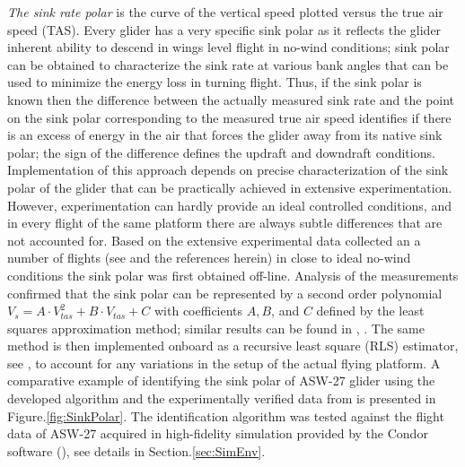 \documentclass{ifacconf}
\begin{document}
\emph{The sink rate polar} is the curve of the vertical speed plotted versus the true air speed (TAS). Every glider has a very specific sink polar as it reflects the glider inherent ability to descend in wings level flight in no-wind conditions; sink polar can be obtained to characterize the sink rate at various bank angles that can be used to minimize the energy loss in turning flight. Thus, if the sink polar is known then the difference between the actually measured sink rate and the point on the sink polar corresponding to the measured true air speed identifies if there is an excess of energy in the air that forces the glider away from its native sink polar; the sign of the difference defines the updraft and downdraft conditions. Implementation of this approach depends on precise characterization of the sink polar of the glider that can be practically achieved in extensive experimentation. However, experimentation can hardly provide an ideal controlled conditions, and in every flight of the same platform there are always subtle differences that are not accounted for. Based on the extensive experimental data collected an a number of flights (see \cite{AKlass_JGCD:2012} and the references herein) in close to ideal no-wind conditions the sink polar was first obtained off-line. Analysis of the measurements confirmed that the sink polar can be represented by a second order polynomial $V_s=A \cdot V_{tas}^2 + B \cdot V_{tas} +C$ with coefficients $A, B$, and $C$ defined by the least squares approximation method; similar results can be found in \cite{Reichmann:1978}, \cite{Edwards:2008}. The same method is then implemented onboard as a recursive least square (RLS) estimator, see \cite{Astrom:1995}, to account for any variations in the setup of the actual flying platform. A comparative example of identifying the sink polar of ASW-27 glider using the developed algorithm and the experimentally verified data  from \cite{Boermans:1994} is presented in Figure.\ref{fig:SinkPolar}. The identification algorithm was tested against the flight data  of ASW-27 acquired in high-fidelity simulation provided by the Condor software (\cite{Condor:2013:Online}), see details in Section.\ref{sec:SimEnv}.
\end{document}
